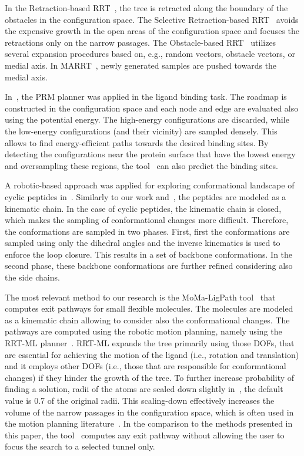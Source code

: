 \documentclass{bmcart}
\begin{document}
In the Retraction-based RRT~\cite{zhangRetraction}, the tree is retracted along the boundary of the obstacles in the configuration space.
The Selective Retraction-based RRT~\cite{lee2012srrrt} avoids the expensive growth in the open areas of the configuration space and focuses the retractions only on the narrow passages.
The Obstacle-based RRT~\cite{amatoOBRRT} utilizes several expansion procedures based on, e.g., random vectors, obstacle vectors, or medial axis.
In MARRT~\cite{denny2014marrt}, newly generated samples are pushed towards the medial axis.

In~\cite{singhLIG}, the PRM planner was applied in the ligand binding task.
The roadmap is constructed in the configuration space and each node and edge are evaluated also using the potential energy.
The high-energy configurations are discarded, while the low-energy configurations (and their vicinity) are sampled densely.
This allows to find energy-efficient paths towards the desired binding sites. 
By detecting the configurations near the protein surface that have the lowest energy and oversampling these regions, the
tool~\cite{singhLIG} can also predict the binding sites.

A robotic-based approach was applied for exploring conformational landscape of cyclic peptides in~\cite{jusot2018exhaustive}.
Similarly to our work and~\cite{cortes2010simulating}, the peptides are modeled as a kinematic chain.
In the case of cyclic peptides, the kinematic chain is closed, which makes the sampling of conformational changes more difficult.
Therefore, the conformations are sampled in two phases.
First, first the conformations are sampled using only the dihedral angles and the inverse kinematics is used to enforce the loop closure.
This results in a set of backbone conformations. 
In the second phase, these backbone conformations are further refined considering also the side chains.

The most relevant method to our research is the MoMa-LigPath tool~\cite{cortes2010simulating} that computes exit pathways
for small flexible molecules.
The molecules are modeled as a kinematic chain allowing to consider also the conformational changes.
The pathways are computed using the robotic motion planning, namely using the RRT-ML planner~\cite{cortes2007mlrrt}.
RRT-ML expands the tree primarily using those DOFs, that are essential for achieving the motion of the ligand (i.e., rotation
and translation) and it employs other DOFs (i.e., those that are responsible for conformational changes) if they hinder the growth of the tree.
To further increase probability of finding a solution, radii of the atoms are scaled down slightly in~\cite{cortes2010simulating}, the default
value is 0.7 of the original radii.
This scaling-down effectively increases the volume of the narrow passages in the configuration space, which is often used
in the motion planning literature~\cite{bayazitIRC,vonasek2018motion,hsu06multilevel}.
In the comparison to the methods presented in this paper, the tool~\cite{cortes2010simulating} computes any exit pathway without allowing the user to focus the search to a selected tunnel only.
\end{document}

